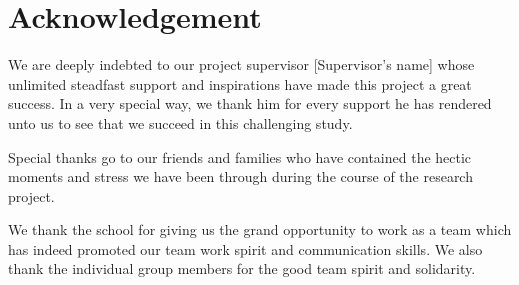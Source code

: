 \cleardoublepage
{}
\chapter*{Acknowledgement}
We are deeply indebted to our project supervisor [Supervisor's name] whose unlimited steadfast support and inspirations have made this project a great success. In a very special way, we thank him for every support he has rendered unto us to see that we succeed in this challenging study.

Special thanks go to our friends and families who have contained the hectic moments and stress we have been through during the course of the research project.

We thank the school for giving us the grand opportunity to work as a team which has indeed promoted our team work spirit and communication skills. We also thank the individual group members for the good team spirit and solidarity.

\newpage
